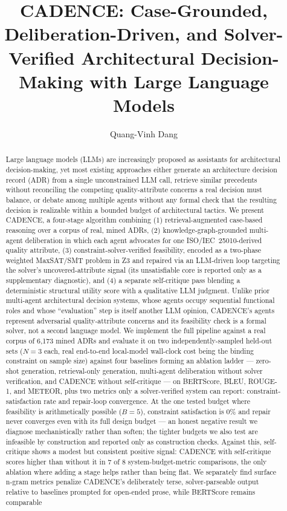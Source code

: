 \documentclass[preprint,12pt,authoryear]{elsarticle}
\renewcommand{\_}{\textunderscore\allowbreak{}}
\begin{document}
\begin{frontmatter}

\title{CADENCE: Case-Grounded, Deliberation-Driven, and Solver-Verified Architectural Decision-Making with Large Language Models}

\author{Quang-Vinh Dang}
\address{British University Vietnam, Hung Yen, Vietnam}

\begin{abstract}
Large language models (LLMs) are increasingly proposed as assistants for architectural decision-making, yet most existing approaches either generate an architecture decision record (ADR) from a single unconstrained LLM call, retrieve similar precedents without reconciling the competing quality-attribute concerns a real decision must balance, or debate among multiple agents without any formal check that the resulting decision is realizable within a bounded budget of architectural tactics. We present CADENCE, a four-stage algorithm combining (1) retrieval-augmented case-based reasoning over a corpus of real, mined ADRs, (2) knowledge-graph-grounded multi-agent deliberation in which each agent advocates for one ISO/IEC~25010-derived quality attribute, (3) constraint-solver-verified feasibility, encoded as a two-phase weighted MaxSAT/SMT problem in Z3 and repaired via an LLM-driven loop targeting the solver's uncovered-attribute signal (its unsatisfiable core is reported only as a supplementary diagnostic), and (4) a separate self-critique pass blending a deterministic structural utility score with a qualitative LLM judgment. Unlike prior multi-agent architectural decision systems, whose agents occupy sequential functional roles and whose ``evaluation'' step is itself another LLM opinion, CADENCE's agents represent adversarial quality-attribute concerns and its feasibility check is a formal solver, not a second language model. We implement the full pipeline against a real corpus of 6{,}173 mined ADRs and evaluate it on two independently-sampled held-out sets ($N=3$ each, real end-to-end local-model wall-clock cost being the binding constraint on sample size) against four baselines forming an ablation ladder --- zero-shot generation, retrieval-only generation, multi-agent deliberation without solver verification, and CADENCE without self-critique --- on BERTScore, BLEU, ROUGE-1, and METEOR, plus two metrics only a solver-verified system can report: constraint-satisfaction rate and repair-loop convergence. At the one tested budget where feasibility is arithmetically possible ($B=5$), constraint satisfaction is 0\% and repair never converges even with its full design budget --- an honest negative result we diagnose mechanistically rather than soften; the tighter budgets we also test are infeasible by construction and reported only as construction checks. Against this, self-critique shows a modest but consistent positive signal: CADENCE with self-critique scores higher than without it in 7 of 8 system-budget-metric comparisons, the only ablation where adding a stage helps rather than being flat. We separately find surface n-gram metrics penalize CADENCE's deliberately terse, solver-parseable output relative to baselines prompted for open-ended prose, while BERTScore remains comparable 
\end{abstract}
\end{frontmatter}
\end{document}

